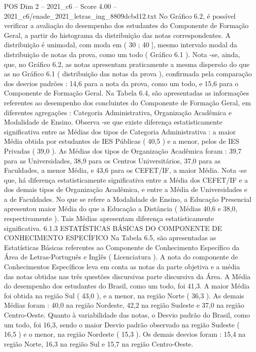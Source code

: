 \begin{textsample}{POS Dim 2 – 2021\_c6 – Score 4.00 – 2021\_c6/enade\_2021\_letras\_ing\_8809dcbd12.txt}
No Gráfico 6.2, é possível verificar a avaliação do desempenho dos estudantes do Componente de Formação Geral, a partir do histograma da distribuição das notas correspondentes.
A distribuição é unimodal, com moda em ( 30 ; 40 ], mesmo intervalo modal da distribuição de notas da prova, como um todo ( Gráfico 6.1 ).
Nota -se, ainda, que, no Gráfico 6.2, as notas apresentam praticamente a mesma dispersão do que as no Gráfico 6.1 ( distribuição das notas da prova ), confirmada pela comparação dos desvios padrões : 14,6 para a nota da prova, como um todo, e 15,6 para o Componente de Formação Geral.
Na Tabela 6.4, são apresentadas as informações referentes ao desempenho dos concluintes do Componente de Formação Geral, em diferentes agregações : Categoria Administrativa, Organização Acadêmica e Modalidade de Ensino.
Observa -se que existe diferença estatisticamente significativa entre as Médias dos tipos de Categoria Administrativa : a maior Média obtida por estudantes de IES Públicas ( 40,5 ) e a menor, pelos de IES Privadas ( 39,0 ).
As Médias dos tipos de Organização Acadêmica foram : 39,7 para as Universidades, 38,9 para os Centros Universitários, 37,0 para as Faculdades, a menor Média, e 43,6 para os CEFET/IF, a maior Média.
Nota -se que, há diferença estatisticamente significativa entre a Média dos CEFET/IF e a dos demais tipos de Organização Acadêmica, e entre a Média de Universidades e a de Faculdades.
No que se refere a Modalidade de Ensino, a Educação Presencial apresentou maior Média do que a Educação a Distância ( Médias 40,6 e 38,0, respectivamente ).
Tais Médias apresentam diferença estatisticamente significativa. 6.1.3 ESTATÍSTICAS BÁSICAS DO COMPONENTE DE CONHECIMENTO ESPECÍFICO Na Tabela 6.5, são apresentadas as Estatísticas Básicas referentes ao Componente de Conhecimento Específico da Área de Letras-Português e Inglês ( Licenciatura ).
A nota do componente de Conhecimentos Específicos leva em conta as notas da parte objetiva e a média das notas obtidas nas três questões discursivas parte discursiva da Área.
A Média do desempenho dos estudantes do Brasil, como um todo, foi 41,3.
A maior Média foi obtida na região Sul ( 43,0 ), e a menor, na região Norte ( 36,3 ).
As demais Médias foram : 40,0 na região Nordeste, 42,2 na região Sudeste e 37,0 na região Centro-Oeste.
Quanto à variabilidade das notas, o Desvio padrão do Brasil, como um todo, foi 16,3, sendo o maior Desvio padrão observado na região Sudeste ( 16,5 ) e o menor, na região Nordeste ( 15,3 ).
Os demais desvios foram : 15,4 na região Norte, 16,3 na região Sul e 15,7 na região Centro-Oeste.

\end{textsample}

